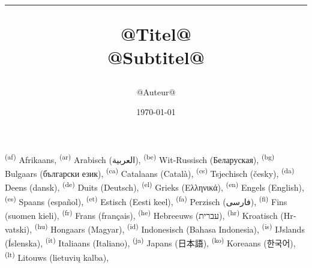 \documentclass[onecolumn,a4paper,10pt]{report}
\begin{document}
\raggedbottom
\title{\color{kleur}\bfseries\Huge \begin{shaded*} \hrule @Titel@ %
\\[1ex] \large @Subtitel@ %
\end{shaded*}}
\author{\color{kleur}@Auteur@}
\vfill
\date{\color{kleur}\today{}}

\maketitle

\setcounter{page}{1}

\tableofcontents
\newpage
\setcounter{page}{1}
\textsuperscript{(af)}  Afrikaans,
\textsuperscript{(ar)} Arabisch (\foreignlanguage{arabic}{العربية}),
\textsuperscript{(be)}  Wit-Russisch (\foreignlanguage{belarusian}{Беларуская}),
\textsuperscript{(bg)}  Bulgaars (\foreignlanguage{bulgarian}{български език}),
\textsuperscript{(ca)} Catalaans (\foreignlanguage{catalan}{Català}),
\textsuperscript{(cs)}  Tsjechisch (\foreignlanguage{czech}{česky}),
\textsuperscript{(da)}  Deens (\foreignlanguage{danish}{dansk}),
\textsuperscript{(de)}  Duits (\foreignlanguage{german}{Deutsch}),
\textsuperscript{(el)}  Grieks (\foreignlanguage{greek}{Ελληνικά}),
\textsuperscript{(en)}  Engels (\foreignlanguage{english}{English}),
\textsuperscript{(es)}  Spaans (\foreignlanguage{spanish}{español}),
\textsuperscript{(et)}  Estisch (\foreignlanguage{estonian}{Eesti keel}),
\textsuperscript{(fa)}  Perzisch (\foreignlanguage{persian}{فارسی}),
\textsuperscript{(fi)}  Fins (\foreignlanguage{finnish}{suomen kieli}),
\textsuperscript{(fr)}  Frans (\foreignlanguage{french}{français}),
\textsuperscript{(he)}  Hebreeuws (\foreignlanguage{hebrew}{עברית}),
\textsuperscript{(hr)}  Kroatisch (\foreignlanguage{croatian}{Hrvatski}),
\textsuperscript{(hu)}  Hongaars (\foreignlanguage{hungarian}{Magyar}),
\textsuperscript{(id)}  Indonesisch (\foreignlanguage{malay}{Bahasa Indonesia}),
\textsuperscript{(is)}  IJslands (\foreignlanguage{icelandic}{Íslenska}),
\textsuperscript{(it)}  Italiaans (\foreignlanguage{italian}{Italiano}),
\textsuperscript{(ja)}  Japans (\foreignlanguage{japanese}{日本語}),
\textsuperscript{(ko)}  Koreaans (\foreignlanguage{korean}{한국어}),
\textsuperscript{(lt)}  Litouws (\foreignlanguage{lithuanian}{lietuvių kalba}),
\end{document}
